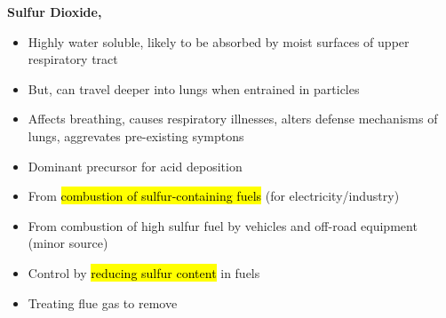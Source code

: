 \documentclass{article}
\newcommand{\headingsmall}[1]{{\small\textbf{#1}}}
\begin{document}
\begin{multicols*}{4}
\headingsmall{Sulfur Dioxide, }
\begin{itemize} \itemsep -0.5em
    \item Highly water soluble, likely to be absorbed by moist surfaces of upper 
        respiratory tract
    \item But, can travel deeper into lungs when entrained in particles
    \item Affects breathing, causes respiratory illnesses, alters defense
        mechanisms of lungs, aggrevates pre-existing symptons
    \item Dominant precursor for acid deposition
    \item From \hl{combustion of sulfur-containing fuels} (for electricity/industry)
    \item From combustion of high sulfur fuel by vehicles and off-road equipment
        (minor source)
    \item Control by \hl{reducing sulfur content} in fuels
    \item Treating flue gas to remove 
\end{itemize}


\end{multicols*}
\end{document}
